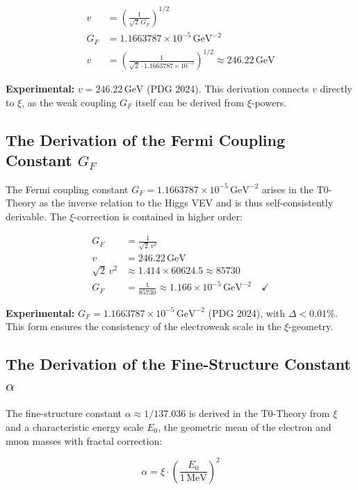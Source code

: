 	\begin{align}
		v &= \left( \frac{1}{\sqrt{2} \, G_F} \right)^{1/2} \\
		G_F &= 1.1663787 \times 10^{-5} \,\si{\giga\electronvolt\tothe{-2}} \\
		v &= \left( \frac{1}{\sqrt{2} \cdot 1.1663787 \times 10^{-5}} \right)^{1/2} \approx 246.22 \,\si{\giga\electronvolt}
	\end{align}
	
	\textbf{Experimental:} $v = 246.22\,\si{\giga\electronvolt}$ (PDG 2024). This derivation connects $v$ directly to $\xi$, as the weak coupling $G_F$ itself can be derived from $\xi$-powers.
	\subsection{The Derivation of the Fermi Coupling Constant $G_F$}
	The Fermi coupling constant $G_F = 1.1663787 \times 10^{-5} \,\si{\giga\electronvolt\tothe{-2}}$ arises in the T0-Theory as the inverse relation to the Higgs VEV and is thus self-consistently derivable. The $\xi$-correction is contained in higher order:
	
	\begin{align}
		G_F &= \frac{1}{\sqrt{2} \, v^2} \\
		v &= 246.22 \,\si{\giga\electronvolt} \\
		\sqrt{2} \, v^2 &\approx 1.414 \times 60624.5 \approx 85730 \\
		G_F &= \frac{1}{85730} \approx 1.166 \times 10^{-5} \,\si{\giga\electronvolt\tothe{-2}} \quad \checkmark
	\end{align}
	
	\textbf{Experimental:} $G_F = 1.1663787 \times 10^{-5} \,\si{\giga\electronvolt\tothe{-2}}$ (PDG 2024), with $\Delta < 0.01\%$. This form ensures the consistency of the electroweak scale in the $\xi$-geometry.
	\subsection{The Derivation of the Fine-Structure Constant $\alpha$}
	The fine-structure constant $\alpha \approx 1/137.036$ is derived in the T0-Theory from $\xi$ and a characteristic energy scale $E_0$, the geometric mean of the electron and muon masses with fractal correction:
	
	\begin{equation}
		\alpha = \xi \cdot \left( \frac{E_0}{1\,\si{\mega\electronvolt}} \right)^2
	\end{equation}
	
